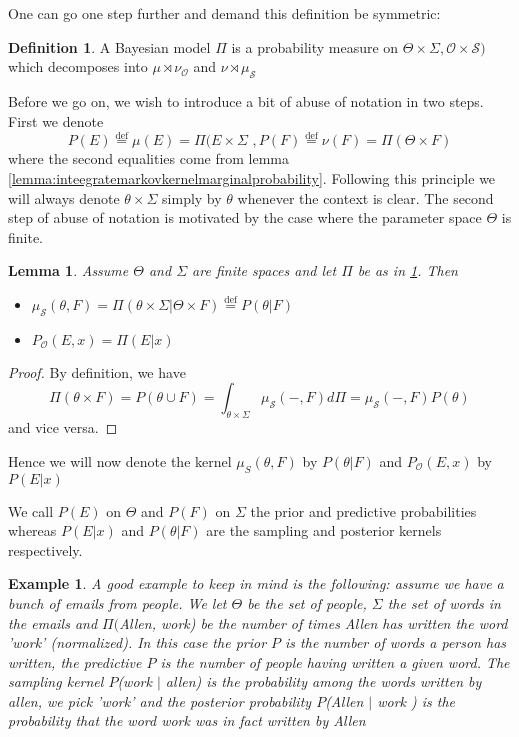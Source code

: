 \documentclass{book}
\theoremstyle{plain}
\newtheorem{example}[corollary]{Example}
\newtheorem{lemma}[corollary]{Lemma}
\theoremstyle{definition}
\newtheorem{definition}[corollary]{Definition}
\newcommand{\define}{\stackrel{\operatorname{def}}{=}}
\renewcommand{\r}[1]{\mathcal{#1}}
\renewcommand{\r}[1]{\mathcal{#1}}
\begin{document}
One can go one step further and demand this definition be symmetric:

\begin{definition}\label{def:bayesianmodel}
A Bayesian model  $\Pi$ is a probability measure on $\Theta\times \Sigma, \r{O}\times \r{S})$ which decomposes into $\mu \rtimes \nu_\r{O}$ and $\nu\rtimes \mu_\r{S}$	
\end{definition}

Before we go on, we wish to introduce a bit of abuse of notation in two steps. First we denote
\[
P(E)\define \mu(E)=\Pi(E\times \Sigma \,\,, P(F)\define \nu(F)=\Pi(\Theta\times F)
\]
where the second equalities come from lemma \ref{lemma:inteegratemarkovkernelmarginalprobability}. Following this principle we will always denote $\theta \times \Sigma$ simply by $\theta$ whenever the context is clear.
The second step of abuse of notation is motivated by the case where the parameter space $\Theta$ is finite.\\

\begin{lemma}
Assume $\Theta$ and $\Sigma$ are finite spaces and let $\Pi$ be as in \ref{def:bayesianmodel}. Then
\begin{itemize}
\item $\mu_\r{S}(\theta,F)=\Pi(\theta\times \Sigma \vert \Theta\times F)\define P(\theta\vert F)$
\item $P_\r{O}(E,x)=\Pi(E\vert x)$
\end{itemize}
\end{lemma}

\begin{proof}
By definition, we have
\[
\Pi(\theta \times F)=P(\theta\cup F)=\int_{\theta\times \Sigma} \mu_\r{S}(-,F)d\Pi=\mu_\r{S}(-,F)P(\theta)
\]
and vice versa.	
\end{proof}

Hence we will now denote the kernel $\mu_{S}(\theta , F)$ by $P(\theta \vert F)$ and $P_\r{O}(E,x)$ by $P(E\vert x)$

We call $P(E)$ on $\Theta$ and $P(F)$ on $\Sigma$ the prior and predictive probabilities whereas $P(E\vert x)$ and $P(\theta\vert F)$ are the sampling and posterior kernels respectively.

\begin{example}
A good example to keep in mind is the following: assume we have a bunch of emails from people. We let $\Theta$ be the set of people, $\Sigma$ the set of words in the emails and $\Pi($Allen, work) be the number of times Allen has written the word 'work' (normalized). In this case the prior  $P$ is the number of words a person has written, the predictive $P$  is the number of people having written a given word. The sampling kernel $P$(work $\vert$ allen) is the probability among the words written by allen, we pick 'work' and the posterior probability $P$(Allen $\vert$ work ) is the probability that the word work was in fact written by Allen
\end{example}
 
\end{document}
